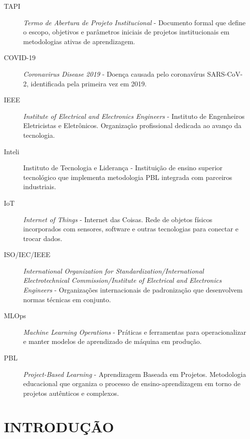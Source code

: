\documentclass[12pt,a4paper]{article}
\begin{document}
\begin{description}
\item[TAPI] \textit{Termo de Abertura de Projeto Institucional} - Documento formal que define o escopo, objetivos e parâmetros iniciais de projetos institucionais em metodologias ativas de aprendizagem.

\item[COVID-19] \textit{Coronavirus Disease 2019} - Doença causada pelo coronavírus SARS-CoV-2, identificada pela primeira vez em 2019.

\item[IEEE] \textit{Institute of Electrical and Electronics Engineers} - Instituto de Engenheiros Eletricistas e Eletrônicos. Organização profissional dedicada ao avanço da tecnologia.

\item[Inteli] Instituto de Tecnologia e Liderança - Instituição de ensino superior tecnológico que implementa metodologia PBL integrada com parceiros industriais.

\item[IoT] \textit{Internet of Things} - Internet das Coisas. Rede de objetos físicos incorporados com sensores, software e outras tecnologias para conectar e trocar dados.

\item[ISO/IEC/IEEE] \textit{International Organization for Standardization/International Electrotechnical Commission/Institute of Electrical and Electronics Engineers} - Organizações internacionais de padronização que desenvolvem normas técnicas em conjunto.

\item[MLOps] \textit{Machine Learning Operations} - Práticas e ferramentas para operacionalizar e manter modelos de aprendizado de máquina em produção.

\item[PBL] \textit{Project-Based Learning} - Aprendizagem Baseada em Projetos. Metodologia educacional que organiza o processo de ensino-aprendizagem em torno de projetos autênticos e complexos.

\end{description}

\newpage
\thispagestyle{empty}
\tableofcontents

\newpage
\pagestyle{plain}
\renewcommand{\baselinestretch}{1.5}
\normalsize
\section{INTRODUÇÃO}
\end{document}
